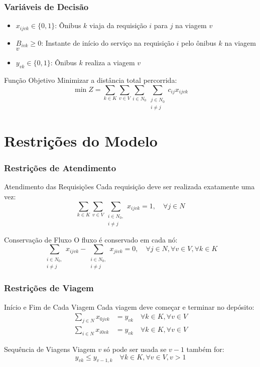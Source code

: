 \documentclass[10pt]{beamer}
\begin{document}
\begin{frame}
\frametitle{Variáveis de Decisão}
\begin{itemize}
    \item $x_{ijvk} \in \{0,1\}$: Ônibus $k$ viaja da requisição $i$ para $j$ na viagem $v$
    \item $B_{ivk} \geq 0$: Instante de início do serviço na requisição $i$ pelo ônibus $k$ na viagem $v$
    \item $y_{vk} \in \{0,1\}$: Ônibus $k$ realiza a viagem $v$
\end{itemize}

\vspace{0.8cm}
\begin{block}{Função Objetivo}
Minimizar a distância total percorrida:
$$\min Z = \sum_{k \in K} \sum_{v \in V} \sum_{i \in N_0} \sum_{\substack{j \in N_0\\i \neq j}} c_{ij} x_{ijvk}$$
\end{block}
\end{frame}

\section{Restrições do Modelo}

\begin{frame}
\frametitle{Restrições de Atendimento}
\begin{block}{Atendimento das Requisições}
Cada requisição deve ser realizada exatamente uma vez:
$$\sum_{k \in K} \sum_{v \in V} \sum_{\substack{i \in N_0,\\i \neq j}} x_{ijvk} = 1, \quad \forall j \in N$$
\end{block}

\begin{block}{Conservação de Fluxo}
O fluxo é conservado em cada nó:
$$\sum_{\substack{i \in N_0,\\i \neq j}} x_{ijvk} - \sum_{\substack{i \in N_0,\\i \neq j}} x_{jivk} = 0, \quad \forall j \in N, \forall v \in V, \forall k \in K$$
\end{block}
\end{frame}

\begin{frame}
\frametitle{Restrições de Viagem}
\begin{block}{Início e Fim de Cada Viagem}
Cada viagem deve começar e terminar no depósito:
\begin{align}
\sum_{j \in N} x_{0jvk} &= y_{vk} \quad \forall k \in K, \forall v \in V \\
\sum_{i \in N} x_{i0vk} &= y_{vk} \quad \forall k \in K, \forall v \in V
\end{align}
\end{block}

\begin{block}{Sequência de Viagens}
Viagem $v$ só pode ser usada se $v-1$ também for:
$$y_{vk} \leq y_{v-1,k} \quad \forall k \in K, \forall v \in V, v > 1$$
\end{block}
\end{frame}
\end{document}
